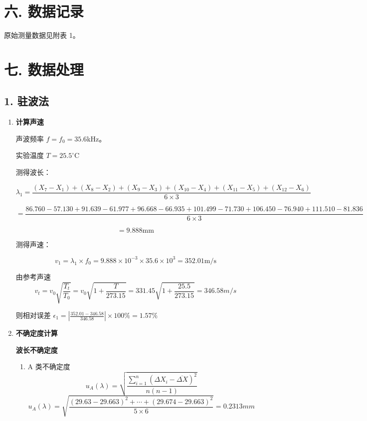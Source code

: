 \documentclass[12pt,a4paper]{article}
\begin{document}
	\section*{\textbf{{六. 数据记录}}}
	
	原始测量数据见附表 1。

	\section*{\textbf{{七. 数据处理}}}

	\subsection*{1. 驻波法}
\begin{enumerate}
    \item \textbf{计算声速}
    
	声波频率 $f = f_{0} = 35.6$kHz。

	实验温度 $T = 25.5^{\circ}\mathrm{C}$

	测得波长：
    
	\begin{footnotesize}
	$$\lambda_{1}=\frac{(X_{7}-X_{1})+(X_{8}-X_{2})+(X_{9}-X_{3})+(X_{10}-X_{4})+(X_{11}-X_{5})+(X_{12}-X_{6})}{6\times3}$$

	$$=\frac{86.760-57.130+91.639-61.977+96.668-66.935+101.499-71.730+106.450-76.940+111.510-81.836}{6\times3}$$

		$$=9.888\mathrm{mm}$$

	\end{footnotesize}

	测得声速：

    $$v_{1}=\lambda_{1}\times f_{0}=9.888\times 10^{-3} \times 35.6\times 10^{3} = 352.01\mathrm{m/s}$$

    由参考声速 
	$$v_{t}=v_{0}\sqrt{\frac{T_{t}}{T_{0}}}=v_{0}\sqrt{1+\frac{T}{273.15}}=331.45\sqrt{1+\frac{25.5}{273.15}}=346.58m/s$$

    则相对误差 $\epsilon_{1}=\left|\frac{352.01-346.58}{346.58}\right|\times 100\%=1.57\%$

    \item \textbf{不确定度计算}
    
    \textbf{波长不确定度}

    \begin{enumerate}
        \item[1)] A 类不确定度
        $$u_{A}(\lambda)=\sqrt{\frac{\sum_{i=1}^{n}(\Delta X_{i}-\overline{\Delta X})^{2}}{n(n-1)}}$$
        $$u_{A}(\lambda)=\sqrt{\frac{(29.63-29.663)^{2}+\cdots+(29.674-29.663)^{2}}{5\times 6}}=0.2313mm$$



\end{enumerate}
\end{enumerate}
\end{document}
